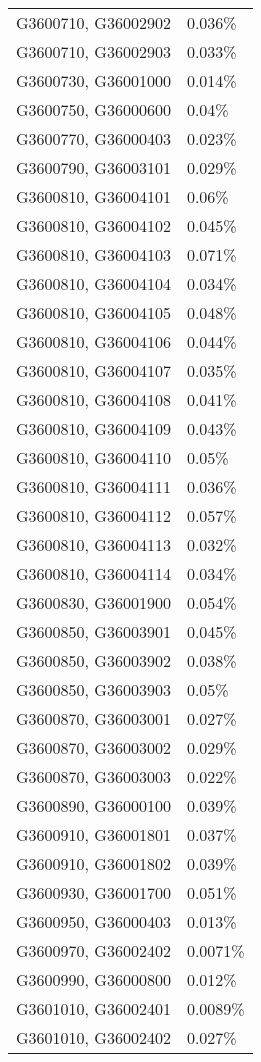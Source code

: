 \begin{longtable}[]{@{}ll@{}}
G3600710, G36002902 & 0.036\% \\
G3600710, G36002903 & 0.033\% \\
G3600730, G36001000 & 0.014\% \\
G3600750, G36000600 & 0.04\% \\
G3600770, G36000403 & 0.023\% \\
G3600790, G36003101 & 0.029\% \\
G3600810, G36004101 & 0.06\% \\
G3600810, G36004102 & 0.045\% \\
G3600810, G36004103 & 0.071\% \\
G3600810, G36004104 & 0.034\% \\
G3600810, G36004105 & 0.048\% \\
G3600810, G36004106 & 0.044\% \\
G3600810, G36004107 & 0.035\% \\
G3600810, G36004108 & 0.041\% \\
G3600810, G36004109 & 0.043\% \\
G3600810, G36004110 & 0.05\% \\
G3600810, G36004111 & 0.036\% \\
G3600810, G36004112 & 0.057\% \\
G3600810, G36004113 & 0.032\% \\
G3600810, G36004114 & 0.034\% \\
G3600830, G36001900 & 0.054\% \\
G3600850, G36003901 & 0.045\% \\
G3600850, G36003902 & 0.038\% \\
G3600850, G36003903 & 0.05\% \\
G3600870, G36003001 & 0.027\% \\
G3600870, G36003002 & 0.029\% \\
G3600870, G36003003 & 0.022\% \\
G3600890, G36000100 & 0.039\% \\
G3600910, G36001801 & 0.037\% \\
G3600910, G36001802 & 0.039\% \\
G3600930, G36001700 & 0.051\% \\
G3600950, G36000403 & 0.013\% \\
G3600970, G36002402 & 0.0071\% \\
G3600990, G36000800 & 0.012\% \\
G3601010, G36002401 & 0.0089\% \\
G3601010, G36002402 & 0.027\% \\

\end{longtable}
